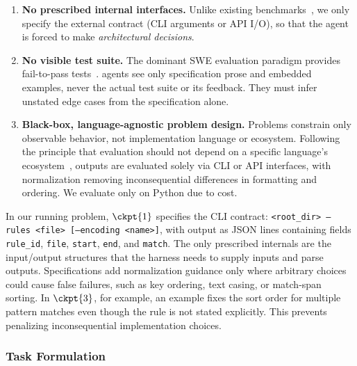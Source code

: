 \begin{enumerate}
    \item \textbf{No prescribed internal interfaces.} Unlike existing benchmarks~\citep{swe-ci,evoclaw}, we only specify the external contract (CLI arguments or API I/O), so that the agent is forced to make \emph{architectural decisions}.
    \item \textbf{No visible test suite.} The dominant SWE evaluation paradigm provides fail-to-pass tests~\citep{swe-bench,swe-bench-plus}. \scb{} agents see only specification prose and embedded examples, never the actual test suite or its feedback. They must infer unstated edge cases from the specification alone.
    \item \textbf{Black-box, language-agnostic problem design.} Problems constrain only observable behavior, not implementation language or ecosystem. Following the principle that evaluation should not depend on a specific language's ecosystem~\citep{multi-swe-bench, swe-polybench, swe-rebench-v2}, outputs are evaluated solely via CLI or API interfaces, with normalization removing inconsequential differences in formatting and ordering. We evaluate only on Python due to cost.
\end{enumerate}

In our running \hyperref[sec:running-example]{\codesearch{}} problem, $\ckpt{1}$ specifies the CLI contract: \texttt{<root\_dir> --rules <file> [--encoding <name>]}, with output as JSON lines containing fields \texttt{rule\_id}, \texttt{file}, \texttt{start}, \texttt{end}, and \texttt{match}. The only prescribed internals are the input/output structures that the harness needs to supply inputs and parse outputs. Specifications add normalization guidance only where arbitrary choices could cause false failures, such as key ordering, text casing, or match-span sorting. In $\ckpt{3}$, for example, an example fixes the sort order for multiple pattern matches even though the rule is not stated explicitly. This prevents penalizing inconsequential implementation choices.

\subsubsection{Task Formulation}\label{sec:eval-setup}

